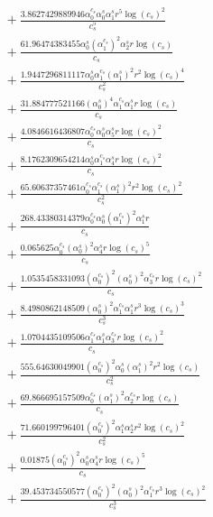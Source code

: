 \documentclass[10pt]{article}
\begin{document}
\begin{align*}
&{}  + \frac{3.8627429889946 \alpha_{0}^{c_s} \alpha_{0}^s \alpha_{1}^s r^{5} \log{\left(c_{s} \right)}^{2}}{c_{s}^{5}} \\
&{}  + \frac{61.96474383455 \alpha_{0}^s \left(\alpha_{1}^{c_s}\right)^{2} \alpha_{2}^s r \log{\left(c_{s} \right)}}{c_{s}} \\
&{}  + \frac{1.9447296811117 \alpha_{0}^s \alpha_{1}^{c_s} \left(\alpha_{1}^s\right)^{2} r^{2} \log{\left(c_{s} \right)}^{4}}{c_{s}^{2}} \\
&{}  + \frac{31.884777521166 \left(\alpha_{0}^s\right)^{4} \alpha_{1}^{c_s} \alpha_{1}^s r \log{\left(c_{s} \right)}}{c_{s}} \\
&{}  + \frac{4.0846616436807 \alpha_{0}^{c_s} \alpha_{0}^s \alpha_{5}^s r \log{\left(c_{s} \right)}^{2}}{c_{s}} \\
&{}  + \frac{8.1762309654214 \alpha_{0}^s \alpha_{1}^{c_s} \alpha_{4}^s r \log{\left(c_{s} \right)}^{2}}{c_{s}} \\
&{}  + \frac{65.60637357461 \alpha_{0}^{c_s} \alpha_{1}^{c_s} \left(\alpha_{1}^s\right)^{2} r^{2} \log{\left(c_{s} \right)}^{2}}{c_{s}^{2}} \\
&{}  + \frac{268.43380314379 \alpha_{0}^{c_s} \alpha_{0}^s \left(\alpha_{1}^{c_s}\right)^{2} \alpha_{1}^s r}{c_{s}} \\
&{}  + \frac{0.065625 \alpha_{0}^{c_s} \left(\alpha_{0}^s\right)^{2} \alpha_{4}^s r \log{\left(c_{s} \right)}^{5}}{c_{s}} \\
&{}  + \frac{1.0535458331093 \left(\alpha_{0}^{c_s}\right)^{2} \left(\alpha_{0}^s\right)^{2} \alpha_{3}^{c_s} r \log{\left(c_{s} \right)}^{2}}{c_{s}} \\
&{}  + \frac{8.4980862148509 \left(\alpha_{0}^s\right)^{2} \alpha_{1}^{c_s} \alpha_{1}^s r^{3} \log{\left(c_{s} \right)}^{3}}{c_{s}^{3}} \\
&{}  + \frac{1.0704435109506 \alpha_{1}^{c_s} \alpha_{1}^s \alpha_{3}^{c_s} r \log{\left(c_{s} \right)}^{2}}{c_{s}} \\
&{}  + \frac{555.64630049901 \left(\alpha_{0}^{c_s}\right)^{2} \alpha_{0}^s \left(\alpha_{1}^s\right)^{2} r^{2} \log{\left(c_{s} \right)}}{c_{s}^{2}} \\
&{}  + \frac{69.866695157509 \alpha_{0}^{c_s} \left(\alpha_{1}^s\right)^{2} \alpha_{2}^{c_s} r \log{\left(c_{s} \right)}}{c_{s}} \\
&{}  + \frac{71.660199796401 \left(\alpha_{0}^{c_s}\right)^{2} \alpha_{1}^s \alpha_{2}^s r^{2} \log{\left(c_{s} \right)}^{2}}{c_{s}^{2}} \\
&{}  + \frac{0.01875 \left(\alpha_{0}^{c_s}\right)^{2} \alpha_{0}^s \alpha_{4}^s r \log{\left(c_{s} \right)}^{5}}{c_{s}} \\
&{}  + \frac{39.453734550577 \left(\alpha_{0}^{c_s}\right)^{2} \left(\alpha_{0}^s\right)^{2} \alpha_{1}^{c_s} r^{3} \log{\left(c_{s} \right)}^{2}}{c_{s}^{3}}
\end{align*}
\end{document}
